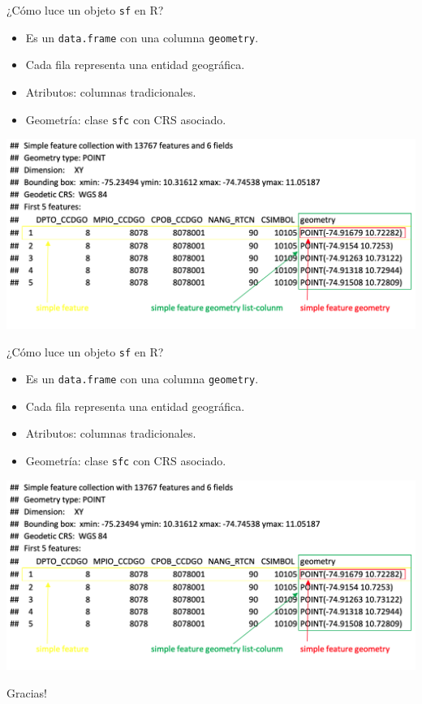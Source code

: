 \documentclass{beamer}
\begin{document}
\begin{frame}{¿Cómo luce un objeto \texttt{sf} en R?}
\begin{itemize}
    \item Es un \texttt{data.frame} con una columna \texttt{geometry}.
    \item Cada fila representa una entidad geográfica.
    \item Atributos: columnas tradicionales.
    \item Geometría: clase \texttt{sfc} con CRS asociado.
\end{itemize}
\centering
\includegraphics[width=0.95\linewidth]{figures/sf_console.png}
\end{frame}

\begin{frame}{¿Cómo luce un objeto \texttt{sf} en R?}
\begin{itemize}
    \item Es un \texttt{data.frame} con una columna \texttt{geometry}.
    \item Cada fila representa una entidad geográfica.
    \item Atributos: columnas tradicionales.
    \item Geometría: clase \texttt{sfc} con CRS asociado.
\end{itemize}
\centering
\includegraphics[width=0.95\linewidth]{figures/sf_console.png}
\end{frame}

\begin{frame}
    \begin{center}
    \Huge Gracias!
    \end{center}
\end{frame}
\end{document}

